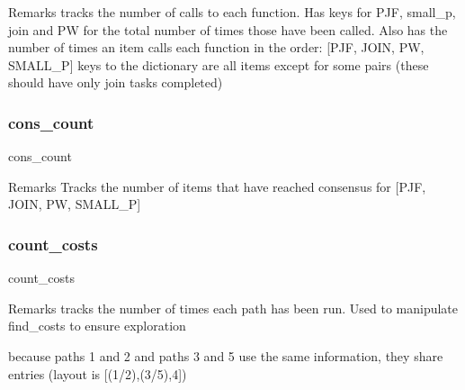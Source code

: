 \begin{DoxyRemark}{Remarks}
tracks the number of calls to each function. Has keys for P\+JF, small\+\_\+p, join and PW for the total number of times those have been called. Also has the number of times an item calls each function in the order\+: \mbox{[}P\+JF, J\+O\+IN, PW, S\+M\+A\+L\+L\+\_\+P\mbox{]} keys to the dictionary are all items except for some pairs (these should have only join tasks completed) 
\end{DoxyRemark}
\mbox{\label{classdynamicfilterapp_1_1models_1_1_join_ace3682116362edac4f94c633d82de3fb}} 
\subsubsection{\texorpdfstring{cons\+\_\+count}{cons\_count}}
{\footnotesize\ttfamily cons\+\_\+count}

\begin{DoxyRemark}{Remarks}
Tracks the number of items that have reached consensus for \mbox{[}P\+JF, J\+O\+IN, PW, S\+M\+A\+L\+L\+\_\+P\mbox{]} 
\end{DoxyRemark}
\mbox{\label{classdynamicfilterapp_1_1models_1_1_join_a6760579c97fc985690cdd3386effeb3c}} 
\subsubsection{\texorpdfstring{count\+\_\+costs}{count\_costs}}
{\footnotesize\ttfamily count\+\_\+costs}

\begin{DoxyRemark}{Remarks}
tracks the number of times each path has been run. Used to manipulate find\+\_\+costs to ensure exploration 

because paths 1 and 2 and paths 3 and 5 use the same information, they share entries (layout is \mbox{[}(1/2),(3/5),4\mbox{]}) 
\end{DoxyRemark}
\mbox{\label{classdynamicfilterapp_1_1models_1_1_join_a73585d7121de037cf2e2ca12b27eb83e}} 
